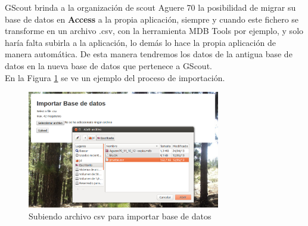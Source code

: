 GScout brinda a la organización de scout Aguere 70 la posibilidad de migrar su base de datos en \textbf{Access} a la propia aplicación, siempre y cuando este fichero se transforme en un archivo .csv, con la herramienta MDB Tools por ejemplo,
y solo haría falta subirla a la aplicación, lo demás lo hace la propia aplicación de manera automática. De esta manera tendremos los datos de la antigua base de datos en la nueva base de datos que pertenece a GScout.\\

En la Figura \ref{fig:import} se ve un ejemplo del proceso de importación.\\ 
\begin{figure}[H]
\begin{center}
\includegraphics[width=0.75\textwidth]{images/import_db.jpg}
\caption{Subiendo archivo csv para importar base de datos}
\label{fig:import}
\end{center}
\end{figure}